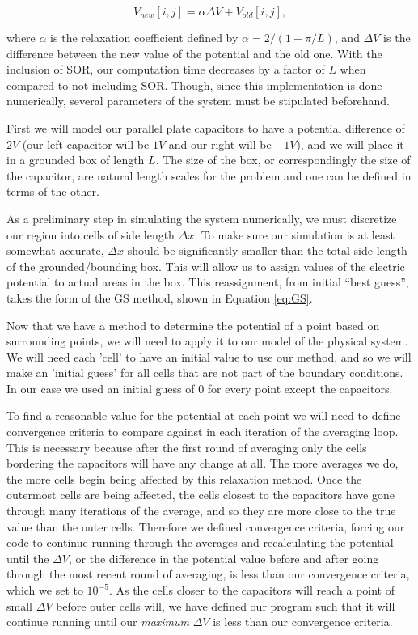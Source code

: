\documentclass{report}
\begin{document}
            \begin{equation} \label{eq:SOR}
                V_{new}[i,j]=\alpha \Delta V +V_{old}[i,j],
            \end{equation}
            
            where $\alpha$ is the relaxation coefficient defined by $\alpha = 2 / (1+ \pi / L)$, and $\Delta V$ is the difference between the new value of the potential and the old one.  With the inclusion of SOR, our computation time decreases by a factor of $L$ when compared to not including SOR.  Though, since this implementation is done numerically, several parameters of the system must be stipulated beforehand.
            
            First we will model our parallel plate capacitors to have a potential difference of $2 V$ (our left capacitor will be $1 V$ and our right will be $-1 V$), and we will place it in a grounded box of length $L$.  The size of the box, or correspondingly the size of the capacitor, are natural length scales for the problem and one can be defined in terms of the other.
            
            As a preliminary step in simulating the system numerically, we must discretize our region into cells of side length $\Delta x$.  To make sure our simulation is at least somewhat accurate, $\Delta x$ should be significantly smaller than the total side length of the grounded/bounding box. This will allow us to assign values of the electric potential to actual areas in the box.  This reassignment, from initial ``best guess'', takes the form of the GS method, shown in Equation \ref{eq:GS}.

            Now that we have a method to determine the potential of a point based on surrounding points, we will need to apply it to our model of the physical system. We will need each 'cell' to have an initial value to use our method, and so we will make an 'initial guess' for all cells that are not part of the boundary conditions. In our case we used an initial guess of $0$ for every point except the capacitors. 
            
            To find a reasonable value for the potential at each point we will need to define convergence criteria to compare against in each iteration of the averaging loop.  This is necessary because after the first round of averaging only the cells bordering the capacitors will have any change at all. The more averages we do, the more cells begin being affected by this relaxation method. Once the outermost cells are being affected, the cells closest to the capacitors have gone through many iterations of the average, and so they are more close to the true value than the outer cells. Therefore we defined convergence criteria, forcing our code to continue running through the averages and recalculating the potential until the $\Delta V$, or the difference in the potential value before and after going through the most recent round of averaging, is less than our convergence criteria, which we set to $10^{-5}$. As the cells closer to the capacitors will reach a point of small $\Delta V$ before outer cells will, we have defined our program such that it will continue running until our \textit{maximum} $\Delta V$ is less than our convergence criteria.
            
\end{document}
